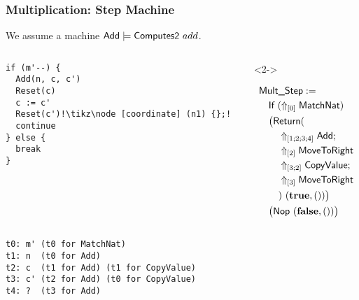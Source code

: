 \documentclass{beamer} %
\renewcommand{\VDash}{\vDash}
\renewcommand{\Vector}[1]{\left[{#1}\right]}
\begin{document}
\begin{frame}
  \frametitle{Multiplication: Step Machine}
  \footnotesize
  
  We assume a machine $\MS{Add} \VDash \MS{Computes2}~add$.

  \begin{columns}
    \begin{column}{0.4\textwidth}
\begin{lstlisting}[escapechar=!]
if (m'--) {
  Add(n, c, c')
  Reset(c)
  c := c'
  Reset(c')!\tikz\node [coordinate] (n1) {};!
  continue
} else {
  break
}
\end{lstlisting}

    \end{column}

    \begin{column}{0.6\textwidth}
      \begin{overlayarea}{\textwidth}{5cm}
        \begin{onlyenv}<2->

          
          \begin{align*}
            & \MS{Mult\_Step} := \\
            & \quad\MS{If}~(\Uparrow_{\Vector{0}} \MS{MatchNat}) \\
            & \quad\bigl(\MS{Return}( \bigr. \\
            & \quad\quad \Uparrow_{\Vector{1; 2; 3; 4}}\MS{Add}; \\
            & \quad\quad \Uparrow_{\Vector{2}} \MS{MoveToRight} \\
            & \quad\quad \Uparrow_{\Vector{3;2}} \MS{CopyValue}; \\
            & \quad\quad \Uparrow_{\Vector{3}} \MS{MoveToRight} \\
            & \quad\quad\bigl. )~(\true, \unit) \bigr) \\
            & \quad\bigl(\MS{Nop}~(\false, \unit)\bigr)
          \end{align*}
        \end{onlyenv}
      \end{overlayarea}
    \end{column}
    
  \end{columns}

\begin{lstlisting}
t0: m' (t0 for MatchNat)
t1: n  (t0 for Add)
t2: c  (t1 for Add) (t1 for CopyValue)
t3: c' (t2 for Add) (t0 for CopyValue)
t4: ?  (t3 for Add)
\end{lstlisting}

\end{frame}
\end{document}

